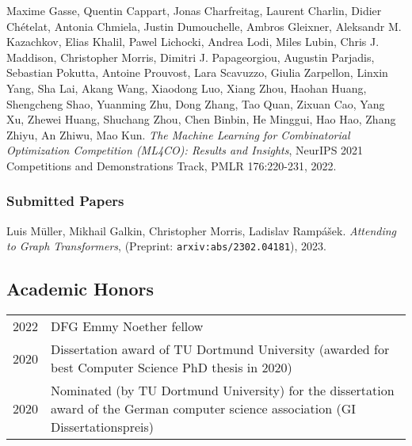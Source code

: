 \documentclass[10pt, a4paper, DIV=14, headings=small]{scrartcl}
\begin{document}
\begin{thebibliography}{15}
	Maxime Gasse, Quentin Cappart, Jonas Charfreitag, Laurent Charlin, Didier Chételat, Antonia Chmiela, Justin Dumouchelle, Ambros Gleixner, Aleksandr M. Kazachkov, Elias Khalil, Pawel Lichocki, Andrea Lodi, Miles Lubin, Chris J. Maddison, Christopher Morris, Dimitri J. Papageorgiou, Augustin Parjadis, Sebastian Pokutta, Antoine Prouvost, Lara Scavuzzo, Giulia Zarpellon, Linxin Yang, Sha Lai, Akang Wang, Xiaodong Luo, Xiang Zhou, Haohan Huang, Shengcheng Shao, Yuanming Zhu, Dong Zhang, Tao Quan, Zixuan Cao, Yang Xu, Zhewei Huang, Shuchang Zhou, Chen Binbin, He Minggui, Hao Hao, Zhang Zhiyu, An Zhiwu, Mao Kun.
	\emph{The Machine Learning for Combinatorial Optimization Competition (ML4CO): Results and Insights}, NeurIPS 2021 Competitions and Demonstrations Track, PMLR 176:220-231, 2022.

	\subsubsection*{Submitted Papers}

	Luis Müller, Mikhail Galkin, Christopher Morris, Ladislav Rampášek.
	\emph{Attending to Graph Transformers}, (Preprint: \texttt{arxiv:abs/2302.04181}), 2023.
\end{thebibliography}

\subsection*{Academic Honors}
 \tabulinesep=0.8mm
\begin{longtabu}{p{2.1cm}p{12.0cm}}
	2022 & DFG Emmy Noether fellow                                                                                                             \\
	2020 & Dissertation award of TU Dortmund University (awarded for best Computer Science PhD thesis in 2020)                                 \\
	2020 & Nominated (by TU Dortmund University) for the dissertation award of the German computer science association (GI Dissertationspreis) \\
\end{longtabu}
\end{document}
